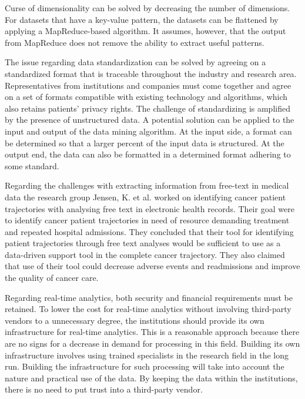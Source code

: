 Curse of dimensionality can be solved by decreasing the number of dimensions. For datasets that have a key-value pattern, the datasets can be flattened by applying a MapReduce-based algorithm. It assumes, however, that the output from MapReduce does not remove the ability to extract useful patterns.

The issue regarding data standardization can be solved by agreeing on a standardized format that is traceable throughout the industry and research area. Representatives from institutions and companies must come together and agree on a set of formats compatible with existing technology and algorithms, which also retains patients’ privacy rights. The challenge of standardizing is amplified by the presence of unstructured data. A potential solution can be applied to the input and output of the data mining algorithm. At the input side, a format can be determined so that a larger percent of the input data is structured. At the output end, the data can also be formatted in a determined format adhering to some standard.

Regarding the challenges with extracting information from free-text in medical data the research group Jensen, K. et al. worked on identifying cancer patient trajectories with analysing free text in electronic health records. Their goal were to identify cancer patient trajectories in need of resource demanding treatment and repeated hospital admissions. They concluded that their tool for identifying patient trajectories through free text analyses would be sufficient to use as a data-driven support tool in the complete cancer trajectory. They also claimed that use of their tool could decrease adverse events and readmissions and improve the quality of cancer care. 

Regarding real-time analytics, both security and financial requirements must be retained. To lower the cost for real-time analytics without involving third-party vendors to a unnecessary degree, the institutions should provide its own infrastructure for real-time analytics. This is a reasonable approach because there are no signs for a decrease in demand for processing in this field. Building its own infrastructure involves using trained specialists in the research field in the long run. Building the infrastructure for such processing will take into account the nature and practical use of the data. By keeping the data within the institutions, there is no need to put trust into a third-party vendor.

